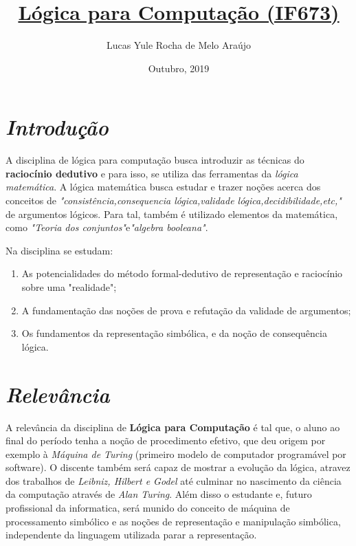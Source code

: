 \documentclass{article}
\title{\textbf{\underline{Lógica para Computação (IF673)}}}
\author{Lucas Yule Rocha de Melo Araújo}
\date{Outubro, 2019}
\begin{document}
\maketitle

\section{\emph{Introdução}}
    A disciplina de lógica para computação busca introduzir as técnicas do \textbf{raciocínio dedutivo} e para isso, se utiliza das ferramentas da \emph{lógica matemática}. A lógica matemática busca estudar e trazer noções acerca dos conceitos de \emph{"consistência,consequencia lógica,validade lógica,decidibilidade,etc,"} de argumentos lógicos. Para tal, também é utilizado elementos da matemática, como \emph{"Teoria dos conjuntos"}e\emph{"algebra booleana"}.\cite{pgDisciplina}

    Na disciplina se estudam:
    \begin{enumerate}
        \item As potencialidades do método formal-dedutivo de representação e raciocínio sobre uma "realidade";
        \item A fundamentação das noções de prova e refutação da validade de argumentos;
        \item Os fundamentos da representação simbólica, e da noção de consequência lógica.
    \end{enumerate}


\section{\emph{Relevância}}
A relevância da disciplina de \textbf{Lógica para Computação} é tal que, o aluno ao final do período tenha a noção de procedimento efetivo, que deu origem por exemplo à \emph{Máquina de Turing} (primeiro modelo de computador programável por software). O discente também será capaz de mostrar a evolução da lógica, atravez dos trabalhos de \emph{Leibniz, Hilbert e Godel} até culminar no nascimento da ciência da computação através de \emph{Alan Turing}. Além disso o estudante e, futuro profissional da informatica, será munido do conceito de máquina de processamento simbólico e as noções de representação e manipulação simbólica, independente da linguagem utilizada parar a representação.\cite{pgLogica}
\end{document}
